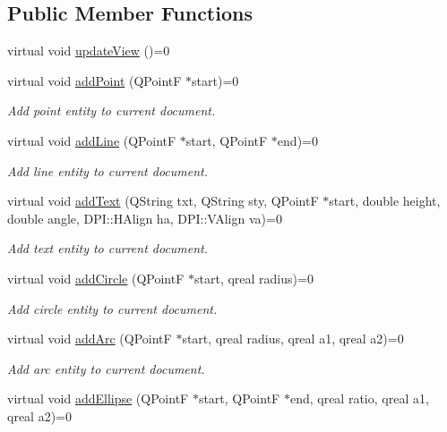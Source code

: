 \subsection*{Public Member Functions}
\begin{DoxyCompactItemize}
\item 
virtual void \hyperlink{classDocument__Interface_a5b446eeb85d5adcf683f7a26647d0af6}{update\-View} ()=0
\item 
virtual void \hyperlink{classDocument__Interface_a6bb098fc42f043f221dd572d52c921dd}{add\-Point} (Q\-Point\-F $\ast$start)=0
\begin{DoxyCompactList}\small\item\em Add point entity to current document. \end{DoxyCompactList}\item 
virtual void \hyperlink{classDocument__Interface_a238743575832ff89cc55fa107251010c}{add\-Line} (Q\-Point\-F $\ast$start, Q\-Point\-F $\ast$end)=0
\begin{DoxyCompactList}\small\item\em Add line entity to current document. \end{DoxyCompactList}\item 
virtual void \hyperlink{classDocument__Interface_acd46b66d8b4322106e37a1a370866d11}{add\-Text} (Q\-String txt, Q\-String sty, Q\-Point\-F $\ast$start, double height, double angle, D\-P\-I\-::\-H\-Align ha, D\-P\-I\-::\-V\-Align va)=0
\begin{DoxyCompactList}\small\item\em Add text entity to current document. \end{DoxyCompactList}\item 
virtual void \hyperlink{classDocument__Interface_af31a359c5bedace1bacfb62f4af8533e}{add\-Circle} (Q\-Point\-F $\ast$start, qreal radius)=0
\begin{DoxyCompactList}\small\item\em Add circle entity to current document. \end{DoxyCompactList}\item 
virtual void \hyperlink{classDocument__Interface_abfa80921b56456c873a0ece0c6c669eb}{add\-Arc} (Q\-Point\-F $\ast$start, qreal radius, qreal a1, qreal a2)=0
\begin{DoxyCompactList}\small\item\em Add arc entity to current document. \end{DoxyCompactList}\item 
virtual void \hyperlink{classDocument__Interface_aa36fde1a3f631cda2e32bec91823d499}{add\-Ellipse} (Q\-Point\-F $\ast$start, Q\-Point\-F $\ast$end, qreal ratio, qreal a1, qreal a2)=0

\end{DoxyCompactItemize}
